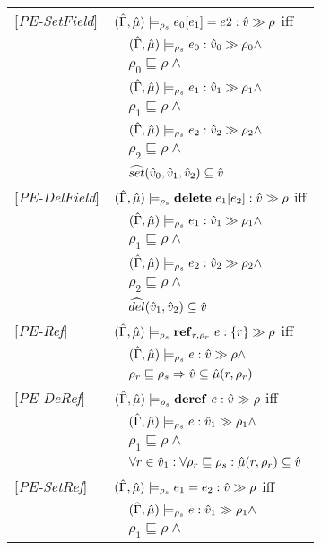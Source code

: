 \documentclass[[12pt,a4paper,twoside,openrigh]{report}
\begin{document}
\begin{tabular} {l l l l}
{[\textit{PE-SetField}]}&\multicolumn{3}{l}{$(\hat{\Gamma},\hat{\mu}) \models_{\rho_s} e_0[e_1] = e2 : \hat{v} \gg \rho $ iff}\\
&&\multicolumn{2}{l}{$ (\hat{\Gamma},\hat{\mu}) \models_{\rho_s} e_0 : \hat{v}_{0} \gg \rho_{0} \wedge $}\\
&&\multicolumn{2}{l}{$\rho_0 \sqsubseteq \rho \wedge$} \\
&&\multicolumn{2}{l}{$ (\hat{\Gamma},\hat{\mu}) \models_{\rho_s} e_1 : \hat{v}_{1} \gg \rho_{1} \wedge $} \\
&&\multicolumn{2}{l}{$\rho_1 \sqsubseteq \rho \wedge$} \\
&&\multicolumn{2}{l}{$ (\hat{\Gamma},\hat{\mu}) \models_{\rho_s} e_2 : \hat{v}_{2} \gg \rho_{2} \wedge $} \\
&&\multicolumn{2}{l}{$\rho_2 \sqsubseteq \rho \wedge$} \\
&&\multicolumn{2}{l}{$\widehat{set} (\hat{v}_0, \hat{v}_1, \hat{v}_2) \subseteq \hat{v}$} \\
{[\textit{PE-DelField}]}&\multicolumn{3}{l}{$(\hat{\Gamma},\hat{\mu}) \models_{\rho_s} \mathbf{delete}\ e_1[e_2] : \hat{v} \gg \rho $ iff}\\
&&\multicolumn{2}{l}{$ (\hat{\Gamma},\hat{\mu}) \models_{\rho_s} e_1 : \hat{v}_{1} \gg \rho_{1} \wedge$}\\
&&\multicolumn{2}{l}{$\rho_1 \sqsubseteq \rho \wedge$} \\
&&\multicolumn{2}{l}{$ (\hat{\Gamma},\hat{\mu}) \models_{\rho_s} e_2 : \hat{v}_{2} \gg \rho_{2} \wedge $} \\
&&\multicolumn{2}{l}{$\rho_2 \sqsubseteq \rho \wedge$} \\
&&\multicolumn{2}{l}{$\widehat{del} (\hat{v}_1, \hat{v}_2) \subseteq \hat{v}$}\\
{[\textit{PE-Ref}]}&\multicolumn{3}{l}{$ (\hat{\Gamma},\hat{\mu}) \models_{\rho_s} \mathbf{ref}_{r,\rho_r}\ e :\{r\} \gg \rho $ iff}\\
&&\multicolumn{2}{l}{$ (\hat{\Gamma},\hat{\mu}) \models_{\rho_s} e : \hat{v} \gg \rho \wedge $}\\
&&\multicolumn{2}{l}{$\rho_r \sqsubseteq \rho_s \Rightarrow \hat{v} \subseteq \hat{\mu}(r, \rho_r) $} \\
{[\textit{PE-DeRef}]}&\multicolumn{3}{l}{$(\hat{\Gamma},\hat{\mu}) \models_{\rho_s} \mathbf{deref}\ e : \hat{v} \gg \rho $ iff}\\
&&\multicolumn{2}{l}{$(\hat{\Gamma},\hat{\mu}) \models_{\rho_s} e : \hat{v}_{1} \gg \rho_{1} \wedge $}\\
&&\multicolumn{2}{l}{$\rho_1 \sqsubseteq \rho \wedge$ }\\
&&\multicolumn{2}{l}{$\forall r \in \hat{v}_1 : \forall \rho_r \sqsubseteq \rho_s : \hat{\mu}(r, \rho_r) \subseteq \hat{v}$ }\\
{[\textit{PE-SetRef}]}&\multicolumn{3}{l}{$(\hat{\Gamma},\hat{\mu}) \models_{\rho_s} e_1 = e_2 : \hat{v} \gg \rho $ iff}\\
&&\multicolumn{2}{l}{$ (\hat{\Gamma},\hat{\mu}) \models_{\rho_s} e : \hat{v}_{1} \gg \rho_{1} \wedge $}\\
&&\multicolumn{2}{l}{$\rho_1 \sqsubseteq \rho \wedge$} \\

\end{tabular}
\end{document}
